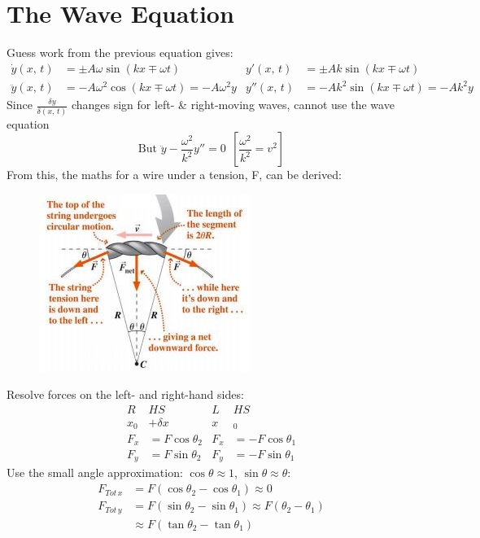 \documentclass[a4paper, 11pt, normalem]{report}
\begin{document}
\section{The Wave Equation}
Guess work from the previous equation gives:
\begin{align}
    \dot{y}(x,\,t) &= \pm A{\omega}\sin{(kx \mp {\omega}t)}                 & y'(x,\,t) &= \pm Ak\sin{(kx \mp {\omega}t)} \\
    \ddot{y}(x,\,t) &= -A\omega^{2}\cos{(kx \mp {\omega}t)} = -A\omega^{2}y & y''(x,\,t) &= -Ak^{2}\sin{(kx \mp {\omega}t)} = -Ak^{2}y
\end{align}
Since $\frac{\delta y}{\delta(x,\,t)}$ changes sign for left- \& right-moving waves, cannot use the wave equation
\begin{equation}
    \text{But } \ddot{y} - \frac{\omega^{2}}{k^{2}}y'' = 0 ~~[\frac{\omega^{2}}{k^{2}} = v^{2}]
\end{equation}
From this, the maths for a wire under a tension, F, can be derived:
\begin{figure}
    \centering
    \includegraphics{Tension.jpg}
\end{figure}
Resolve forces on the left- and right-hand sides:
\begin{align}
         R&HS                  &      L&HS                   \\
    x_{0} &+ {\delta}x         &      x&_{0}                 \\
    F_{x} &= F\cos{\theta_{2}} & F_{x} &= -F\cos{\theta_{1}} \\
    F_{y} &= F\sin{\theta_{2}} & F_{y} &= -F\sin{\theta_{1}}
\end{align}
Use the small angle approximation: $\cos{\theta} \approx 1$, $\sin{\theta} \approx \theta$:
\begin{align}
    F_{Tot\,x} &= F(\cos{\theta_{2}} - \cos{\theta_{1}}) \approx 0 \\
    F_{Tot\,y} &= F(\sin{\theta_{2}} - \sin{\theta_{1}}) \approx F(\theta_{2} - \theta_{1}) \\
               &\approx F(\tan{\theta_{2}} - \tan{\theta_{1}})
\end{align}
\end{document}
